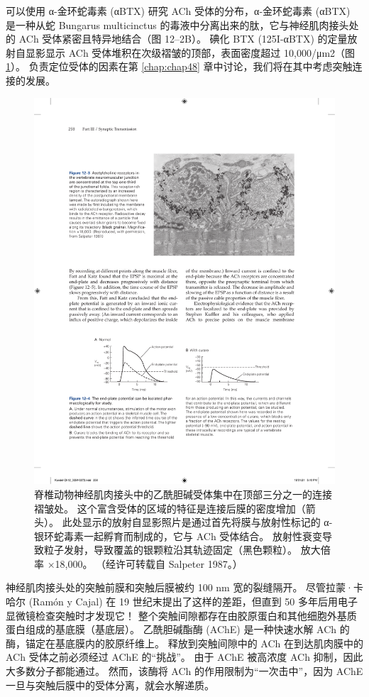 可以使用 α-金环蛇毒素 (αBTX) 研究 ACh 受体的分布，α-金环蛇毒素 (αBTX) 是一种从蛇 Bungarus multicinctus 的毒液中分离出来的肽，它与神经肌肉接头处的 ACh 受体紧密且特异地结合（图 12–2B）。 
碘化 BTX (125I-αBTX) 的定量放射自显影显示 ACh 受体堆积在次级褶皱的顶部，表面密度超过 10,000/μm2（图 \ref{fig:12_3}）。 
负责定位受体的因素在第 \ref{chap:chap48} 章中讨论，我们将在其中考虑突触连接的发展。

\begin{figure}[htbp]
	\centering
	\includegraphics[width=0.6\linewidth]{chap12/fig_12_3}
	\caption{脊椎动物神经肌肉接头中的乙酰胆碱受体集中在顶部三分之一的连接褶皱处。 
		这个富含受体的区域的特征是连接后膜的密度增加（箭头）。 
		此处显示的放射自显影照片是通过首先将膜与放射性标记的 α-银环蛇毒素一起孵育而制成的，它与 ACh 受体结合。 
		放射性衰变导致粒子发射，导致覆盖的银颗粒沿其轨迹固定（黑色颗粒）。 
		放大倍率 ×18,000。 （经许可转载自 Salpeter 1987。）}
	\label{fig:12_3}
\end{figure}




神经肌肉接头处的突触前膜和突触后膜被约 100 nm 宽的裂缝隔开。 
尽管拉蒙·卡哈尔 (Ramón y Cajal) 在 19 世纪末提出了这样的差距，但直到 50 多年后用电子显微镜检查突触时才发现它！ 
整个突触间隙都存在由胶原蛋白和其他细胞外基质蛋白组成的基底膜（基底层）。 
乙酰胆碱酯酶 (AChE) 是一种快速水解 ACh 的酶，锚定在基底膜内的胶原纤维上。 
释放到突触间隙中的 ACh 在到达肌肉膜中的 ACh 受体之前必须经过 AChE 的“挑战”。 
由于 AChE 被高浓度 ACh 抑制，因此大多数分子都能通过。 
然而，该酶将 ACh 的作用限制为“一次击中”，因为 AChE 一旦与突触后膜中的受体分离，就会水解递质。




